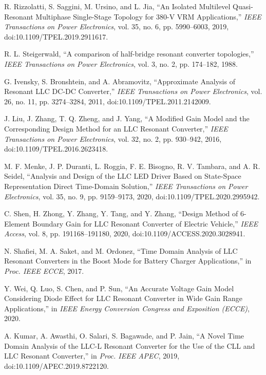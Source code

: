 \documentclass{article} %
\begin{document}
\begin{thebibliography}{99}
R. Rizzolatti, S. Saggini, M. Ursino, and L. Jia,
``An Isolated Multilevel Quasi-Resonant Multiphase Single-Stage Topology for 380-V VRM Applications,''
\emph{IEEE Transactions on Power Electronics},
vol. 35, no. 6, pp. 5990--6003, 2019,
doi:10.1109/TPEL.2019.2911617.

R. L. Steigerwald,
``A comparison of half-bridge resonant converter topologies,''
\emph{IEEE Transactions on Power Electronics},
vol. 3, no. 2, pp. 174--182, 1988.

G. Ivensky, S. Bronshtein, and A. Abramovitz,
``Approximate Analysis of Resonant LLC DC-DC Converter,''
\emph{IEEE Transactions on Power Electronics},
vol. 26, no. 11, pp. 3274--3284, 2011,
doi:10.1109/TPEL.2011.2142009.

J. Liu, J. Zhang, T. Q. Zheng, and J. Yang,
``A Modified Gain Model and the Corresponding Design Method for an LLC Resonant Converter,''
\emph{IEEE Transactions on Power Electronics},
vol. 32, no. 2, pp. 930--942, 2016,
doi:10.1109/TPEL.2016.2623418.

M. F. Menke, J. P. Duranti, L. Roggia, F. E. Bisogno, R. V. Tambara, and A. R. Seidel,
``Analysis and Design of the LLC LED Driver Based on State-Space Representation Direct Time-Domain Solution,''
\emph{IEEE Transactions on Power Electronics},
vol. 35, no. 9, pp. 9159--9173, 2020,
doi:10.1109/TPEL.2020.2995942.

C. Shen, H. Zhong, Y. Zhang, Y. Tang, and Y. Zhang,
``Design Method of 6-Element Boundary Gain for LLC Resonant Converter of Electric Vehicle,''
\emph{IEEE Access},
vol. 8, pp. 191168--191180, 2020,
doi:10.1109/ACCESS.2020.3028941.

N. Shafiei, M. A. Saket, and M. Ordonez,
``Time Domain Analysis of LLC Resonant Converters in the Boost Mode for Battery Charger Applications,''
in \emph{Proc. IEEE ECCE}, 2017.

Y. Wei, Q. Luo, S. Chen, and P. Sun,
``An Accurate Voltage Gain Model Considering Diode Effect for LLC Resonant Converter in Wide Gain Range Applications,''
in \emph{IEEE Energy Conversion Congress and Exposition (ECCE)}, 2020.

A. Kumar, A. Awasthi, O. Salari, S. Bagawade, and P. Jain,
``A Novel Time Domain Analysis of the LLC-L Resonant Converter for the Use of the CLL and LLC Resonant Converter,''
in \emph{Proc. IEEE APEC}, 2019,
doi:10.1109/APEC.2019.8722120.


\end{thebibliography}
\end{document}
